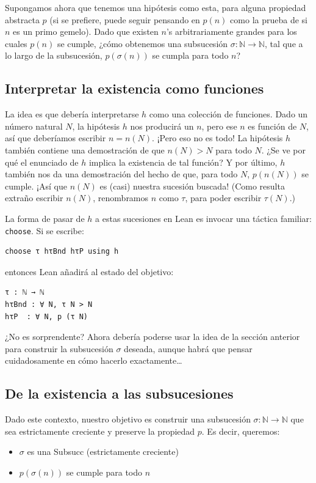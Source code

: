 Supongamos ahora que tenemos una hipótesis como esta, para alguna propiedad
abstracta $p$ (si se prefiere, puede seguir pensando en $p(n)$ como la
prueba de si $n$ es un primo gemelo). Dado que existen $n$'s
arbitrariamente grandes para los cuales $p(n)$ se cumple, ¿cómo obtenemos
una subsucesión $\sigma : \mathbb{N} \to \mathbb{N}$, tal que a lo largo de
la subsucesión, $p(\sigma(n))$ se cumpla para todo $n$?

\subsection{Interpretar la existencia como funciones}

La idea es que debería interpretarse $h$ como una colección de funciones.
Dado un número natural $N$, la hipótesis $h$ nos producirá un $n$, pero
ese $n$ es función de $N$, así que deberíamos escribir $n = n(N)$. ¡Pero
eso no es todo! La hipótesis $h$ también contiene una demostración de que
$n(N) > N$ para todo $N$. ¿Se ve por qué el enunciado de $h$ implica la
existencia de tal función? Y por último, $h$ también nos da una
demostración del hecho de que, para todo $N$, $p(n(N))$ se cumple. ¡Así
que $n(N)$ es (casi) nuestra sucesión buscada! (Como resulta extraño
escribir $n(N)$, renombramos $n$ como $\tau$, para poder escribir
$\tau(N)$.)

La forma de pasar de $h$ a estas sucesiones en Lean es invocar una táctica
familiar: \texttt{choose}. Si se escribe:

\begin{verbatim}
choose τ hτBnd hτP using h
\end{verbatim}

entonces Lean añadirá al estado del objetivo:

\begin{verbatim}
τ : ℕ → ℕ
hτBnd : ∀ N, τ N > N
hτP  : ∀ N, p (τ N)
\end{verbatim}

¿No es sorprendente? Ahora debería poderse usar la idea de la sección
anterior para construir la subsucesión $\sigma$ deseada, aunque habrá que
pensar cuidadosamente en cómo hacerlo exactamente\ldots

\subsection{De la existencia a las subsucesiones}

Dado este contexto, nuestro objetivo es construir una subsucesión
$\sigma : \mathbb{N} \to \mathbb{N}$ que sea estrictamente creciente y
preserve la propiedad $p$. Es decir, queremos:
\begin{itemize}[nosep]
  \item $\sigma$ es una Subsucc (estrictamente creciente)
  \item $p(\sigma(n))$ se cumple para todo $n$
\end{itemize}

